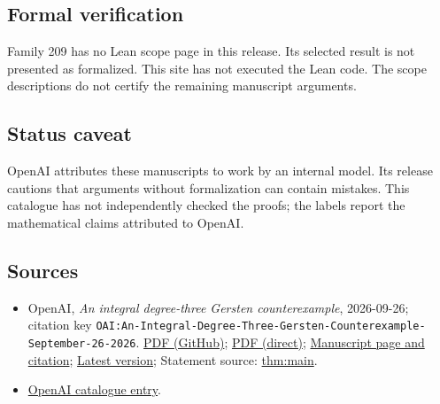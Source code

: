 \documentclass[11pt]{article}
\begin{document}
\subsection{Formal verification}
Family 209 has no Lean scope page in this release. Its selected result is not presented as formalized. This site has not executed the Lean code. The scope descriptions do not certify the remaining manuscript arguments.

\subsection{Status caveat}
OpenAI attributes these manuscripts to work by an internal model. Its release cautions that arguments without formalization can contain mistakes. This catalogue has not independently checked the proofs; the labels report the mathematical claims attributed to OpenAI.

\subsection{Sources}
\begin{itemize}
\item OpenAI, \emph{An integral degree-three Gersten counterexample}, 2026-09-26; citation key \texttt{OAI:An-Integral-Degree-Three-Gersten-Counterexample-September-26-2026}. \href{https://github.com/openai/math/blob/adc7f1241b42e322a6451854ab7e4b4c146bf78a/preprints/An-Integral-Degree-Three-Gersten-Counterexample-September-26-2026/paper.pdf}{PDF (GitHub)}; \href{https://github.com/openai/math/raw/adc7f1241b42e322a6451854ab7e4b4c146bf78a/preprints/An-Integral-Degree-Three-Gersten-Counterexample-September-26-2026/paper.pdf}{PDF (direct)}; \href{https://github.com/openai/math/blob/adc7f1241b42e322a6451854ab7e4b4c146bf78a/preprints/An-Integral-Degree-Three-Gersten-Counterexample-September-26-2026/README.md}{Manuscript page and citation}; \href{https://github.com/openai/math/blob/main/preprints/An-Integral-Degree-Three-Gersten-Counterexample-September-26-2026/paper.pdf}{Latest version}; Statement source: \href{https://github.com/openai/math/blob/adc7f1241b42e322a6451854ab7e4b4c146bf78a/preprints/An-Integral-Degree-Three-Gersten-Counterexample-September-26-2026/build/sections/introduction.tex\#L29}{thm:main}.
\item \href{https://github.com/openai/math/blob/adc7f1241b42e322a6451854ab7e4b4c146bf78a/CONTENTS.md}{OpenAI catalogue entry}.
\end{itemize}
\end{document}
